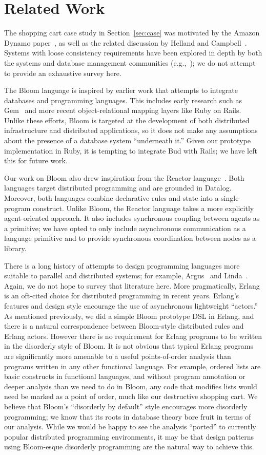 \section{Related Work}
\label{sec:relwork}
The shopping cart case study in Section~\ref{sec:case} was motivated by the
Amazon Dynamo paper~\cite{dynamo}, as well as the related discussion by Helland
and Campbell~\cite{quicksand}. Systems with loose consistency requirements have
been explored in depth by both the systems and database management communities
(e.g.,~\cite{sagas,leases,dangers,bayou}); we do not attempt to provide
an exhaustive survey here.

The Bloom language is inspired by earlier work that attempts to integrate
databases and programming languages.  This includes early research such as
Gem~\cite{gem} and more recent object-relational mapping layers like Ruby on
Rails.  Unlike these efforts, Bloom is targeted at the development of both
distributed infrastructure and distributed applications, so it does not make any
assumptions about the presence of a database system ``underneath it.''  Given
our prototype implementation in Ruby, it is tempting to integrate Bud with
Rails; we have left this for future work.

Our work on Bloom also drew inspiration from the Reactor
language~\cite{reactors}. Both languages target distributed programming and are
grounded in Datalog. Moreover, both languages combine declarative rules and
state into a single program construct. Unlike Bloom, the Reactor language takes
a more explicitly agent-oriented approach. It also includes synchronous coupling
between agents as a primitive; we have opted to only include asynchronous
communication as a language primitive and to provide synchronous coordination
between nodes as a library.

There is a long history of attempts to design programming languages more
suitable to parallel and distributed systems; for example, Argus~\cite{argus}
and Linda~\cite{linda}.  Again, we do not hope to survey that literature here.
More pragmatically, Erlang is an oft-cited choice for distributed programming in
recent years.  Erlang's features and design style encourage the use of
asynchronous lightweight ``actors.''  As mentioned previously, we did a simple
Bloom prototype DSL in Erlang, and there is a natural correspondence between
Bloom-style distributed rules and Erlang actors.  However there is no
requirement for Erlang programs to be written in the disorderly style of
Bloom. It is not obvious that typical Erlang programs are significantly more
amenable to a useful points-of-order analysis than programs written in any other
functional language.  For example, ordered lists are basic constructs in
functional languages, and without program annotation or deeper analysis than we
need to do in Bloom, any code that modifies lists would need be marked as a
point of order, much like our destructive shopping cart.  We believe that
Bloom's ``disorderly by default'' style encourages more disorderly programming;
we know that its roots in database theory bore fruit in terms of our analysis.
While we would be happy to see the analysis ``ported'' to currently popular
distributed programming environments, it may be that design patterns using
Bloom-esque disorderly programming are the natural way to achieve this.
